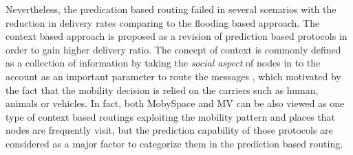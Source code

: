 Nevertheless, the predication based routing failed in several scenarios with the reduction in delivery rates comparing to the flooding based approach.
The context based approach is proposed as a revision of prediction based protocols in order to gain higher delivery ratio.
The concept of context is commonly defined as a collection of information by taking the \emph{social aspect} of nodes in to the account as an important parameter to route the messages \cite{Nguyen2009}, which motivated by the fact that the mobility decision is relied on the carriers such as human, animals or vehicles.
In fact, both MobySpace and MV can be also viewed as one type of context based routings exploiting the mobility pattern and places that nodes are frequently visit, but the prediction capability of those protocols are considered as a major factor to categorize them in the prediction based routing.

